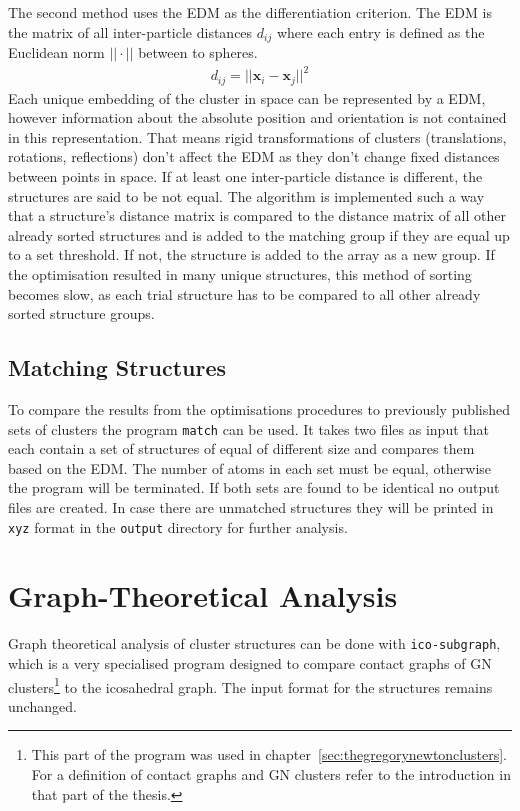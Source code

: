 The second method uses the \ac{EDM} as the differentiation criterion. The
\ac{EDM} is the matrix of all inter-particle distances $d_{ij}$ where
each entry is defined as the Euclidean norm $||\cdot||$ between to spheres.
%
\begin{align}
    d_{ij}=||\mathbf{x}_i-\mathbf{x}_j||^2
\end{align}
%
Each unique embedding of the cluster in space can be represented by a \ac{EDM},
however information about the absolute position and orientation is not contained
in this representation. That means rigid transformations of clusters
(translations, rotations, reflections) don't affect the \ac{EDM} as they don't
change fixed distances between points in
space.\autocite{Dokmanic_EuclideanDistanceMatrices_2015} If at least one
inter-particle distance is different, the structures are said to be not equal.
The algorithm is implemented such a way that a structure's distance matrix is
compared to the distance matrix of all other already sorted structures and is
added to the matching group if they are equal up to a set threshold. If not, the
structure is added to the array as a new group. If the optimisation resulted in
many unique structures, this method of sorting becomes slow, as each trial
structure has to be compared to all other already sorted structure groups.

\subsection{Matching Structures}
\label{sec:matchingstructures}

To compare the results from the optimisations procedures to previously
published sets of clusters the program \verb|match| can be used. It takes two
files as input that each contain a set of structures of equal of different size
and compares them based on the \ac{EDM}. The number of atoms in each set must
be equal, otherwise the program will be terminated. If both sets are found to
be identical no output files are created. In case there are unmatched
structures they will be printed in \verb|xyz| format in the \verb|output|
directory for further analysis.

\section{Graph-Theoretical Analysis}
\label{sec:GraphTheoreticalAnalysis}

Graph theoretical analysis of cluster structures can be done with
\verb|ico-subgraph|, which is a very specialised program designed to compare
contact graphs of \ac{GN} clusters\footnote{This part of the program was used in
chapter~\ref{sec:thegregorynewtonclusters}. For a definition of contact graphs
and \ac{GN} clusters refer to the introduction in that part of the thesis.} to
the icosahedral graph. The input format for the structures remains unchanged.

